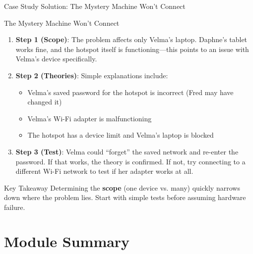 \documentclass[aspectratio=169]{beamer}  %
\begin{document}
\begin{frame}{Case Study Solution: The Mystery Machine Won't Connect}
    \begin{casesolution}{The Mystery Machine Won't Connect}
        \begin{enumerate}
            \item \textbf{Step 1 (Scope)}: The problem affects only Velma's laptop. Daphne's tablet works fine, and the hotspot itself is functioning---this points to an issue with Velma's device specifically.
            \item \textbf{Step 2 (Theories)}: Simple explanations include:
                \begin{itemize}
                    \item Velma's saved password for the hotspot is incorrect (Fred may have changed it)
                    \item Velma's Wi-Fi adapter is malfunctioning
                    \item The hotspot has a device limit and Velma's laptop is blocked
                \end{itemize}
            \item \textbf{Step 3 (Test)}: Velma could ``forget'' the saved network and re-enter the password. If that works, the theory is confirmed. If not, try connecting to a different Wi-Fi network to test if her adapter works at all.
        \end{enumerate}
    \end{casesolution}
    
    \begin{alertblock}{Key Takeaway}
        Determining the \textbf{scope} (one device vs. many) quickly narrows down where the problem lies. Start with simple tests before assuming hardware failure.
    \end{alertblock}
\end{frame}

\section*{Module Summary}
\end{document}
